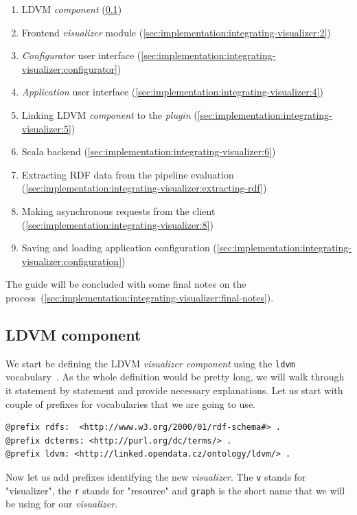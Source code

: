 \begin{enumerate}
\item LDVM \emph{component} (\ref{sec:implementation:integrating-visualizer:ldvm})
\item Frontend \emph{visualizer} module (\ref{sec:implementation:integrating-visualizer:2})
\item \emph{Configurator} user interface (\ref{sec:implementation:integrating-visualizer:configurator})
\item \emph{Application} user interface (\ref{sec:implementation:integrating-visualizer:4})
\item Linking LDVM \emph{component} to the \emph{plugin} (\ref{sec:implementation:integrating-visualizer:5})
\item Scala backend  (\ref{sec:implementation:integrating-visualizer:6})
\item Extracting RDF data from the pipeline evaluation  (\ref{sec:implementation:integrating-visualizer:extracting-rdf})
\item Making asynchronous requests from the client (\ref{sec:implementation:integrating-visualizer:8})
\item Saving and loading application configuration (\ref{sec:implementation:integrating-visualizer:configuration})
\end{enumerate}

The guide will be concluded with some final notes on the process~(\ref{sec:implementation:integrating-visualizer:final-notes}).

\subsection{LDVM component}
\label{sec:implementation:integrating-visualizer:ldvm}

We start be defining the LDVM \emph{visualizer component} using the \texttt{ldvm} vocabulary~\cite{ldvm_vocabulary}. As the whole definition would be pretty long, we will walk through it statement by statement and provide necessary explanations. Let us start with couple of prefixes for vocabularies that we are going to use.

\scriptsize
\begin{verbatim}
@prefix rdfs:  <http://www.w3.org/2000/01/rdf-schema#> .
@prefix dcterms: <http://purl.org/dc/terms/> .
@prefix ldvm: <http://linked.opendata.cz/ontology/ldvm/> .
\end{verbatim}
\normalsize

Now let us add prefixes identifying the new \emph{visualizer}. The \texttt{v} stands for "visualizer", the \texttt{r} stands for "resource" and \texttt{graph} is the short name that we will be using for our \emph{visualizer}.

